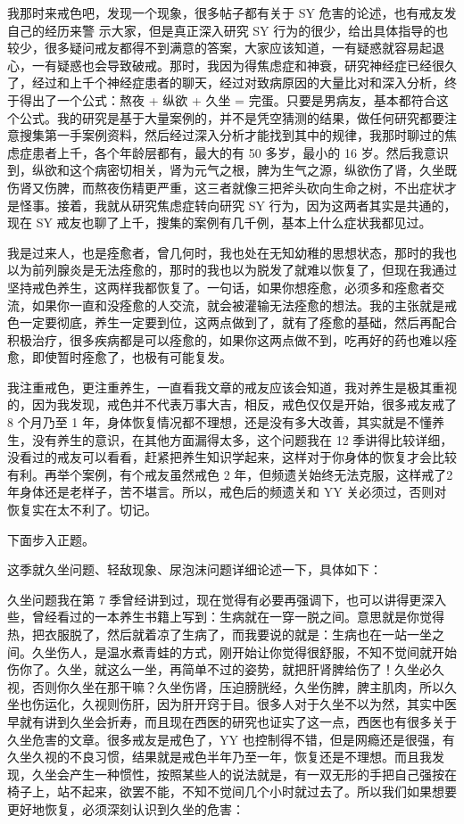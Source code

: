 \documentclass[fontset=founder]{ctexart}
\begin{document}
我那时来戒色吧，发现一个现象，很多帖子都有关于 SY 危害的论述，也有戒友发自己的经历来警 示大家，但是真正深入研究 SY 行为的很少，给出具体指导的也较少，很多疑问戒友都得不到满意的答案，大家应该知道，一有疑惑就容易起退心，一有疑惑也会导致破戒。那时，我因为得焦虑症和神衰，研究神经症已经很久了，经过和上千个神经症患者的聊天，经过对致病原因的大量比对和深入分析，终于得出了一个公式：熬夜 + 纵欲 + 久坐 = 完蛋。只要是男病友，基本都符合这个公式。我的研究是基于大量案例的，并不是凭空猜测的结果，做任何研究都要注意搜集第一手案例资料，然后经过深入分析才能找到其中的规律，我那时聊过的焦虑症患者上千，各个年龄层都有，最大的有 50 多岁，最小的 16 岁。然后我意识到，纵欲和这个病密切相关，肾为元气之根，脾为生气之源，纵欲伤了肾，久坐既伤肾又伤脾，而熬夜伤精更严重，这三者就像三把斧头砍向生命之树，不出症状才是怪事。接着，我就从研究焦虑症转向研究 SY 行为，因为这两者其实是共通的，现在 SY 戒友也聊了上千，搜集的案例有几千例，基本上什么症状我都见过。

我是过来人，也是痊愈者，曾几何时，我也处在无知幼稚的思想状态，那时的我也以为前列腺炎是无法痊愈的，那时的我也以为脱发了就难以恢复了，但现在我通过坚持戒色养生，这两样我都恢复了。一句话，如果你想痊愈，必须多和痊愈者交流，如果你一直和没痊愈的人交流，就会被灌输无法痊愈的想法。我的主张就是戒色一定要彻底，养生一定要到位，这两点做到了，就有了痊愈的基础，然后再配合积极治疗，很多疾病都是可以痊愈的，如果你这两点做不到，吃再好的药也难以痊愈，即使暂时痊愈了，也极有可能复发。

我注重戒色，更注重养生，一直看我文章的戒友应该会知道，我对养生是极其重视的，因为我发现，戒色并不代表万事大吉，相反，戒色仅仅是开始，很多戒友戒了 8 个月乃至 1 年，身体恢复情况都不理想，还是没有多大改善，其实就是不懂养生，没有养生的意识，在其他方面漏得太多，这个问题我在 12 季讲得比较详细，没看过的戒友可以看看，赶紧把养生知识学起来，这样对于你身体的恢复才会比较有利。再举个案例，有个戒友虽然戒色 2 年，但频遗关始终无法克服，这样戒了2年身体还是老样子，苦不堪言。所以，戒色后的频遗关和 YY 关必须过，否则对恢复实在太不利了。切记。

下面步入正题。

这季就久坐问题、轻敌现象、尿泡沫问题详细论述一下，具体如下：

久坐问题我在第 7 季曾经讲到过，现在觉得有必要再强调下，也可以讲得更深入些，曾经看过的一本养生书籍上写到：生病就在一穿一脱之间。意思就是你觉得热，把衣服脱了，然后就着凉了生病了，而我要说的就是：生病也在一站一坐之间。久坐伤人，是温水煮青蛙的方式，刚开始让你觉得很舒服，不知不觉间就开始伤你了。久坐，就这么一坐，再简单不过的姿势，就把肝肾脾给伤了！久坐必久视，否则你久坐在那干嘛？久坐伤肾，压迫膀胱经，久坐伤脾，脾主肌肉，所以久坐也伤运化，久视则伤肝，因为肝开窍于目。很多人对于久坐不以为然，其实中医早就有讲到久坐会折寿，而且现在西医的研究也证实了这一点，西医也有很多关于久坐危害的文章。很多戒友是戒色了，YY 也控制得不错，但是网瘾还是很强，有久坐久视的不良习惯，结果就是戒色半年乃至一年，恢复还是不理想。而且我发现，久坐会产生一种惯性，按照某些人的说法就是，有一双无形的手把自己强按在椅子上，站不起来，欲罢不能，不知不觉间几个小时就过去了。所以我们如果想要更好地恢复，必须深刻认识到久坐的危害：
\end{document}
